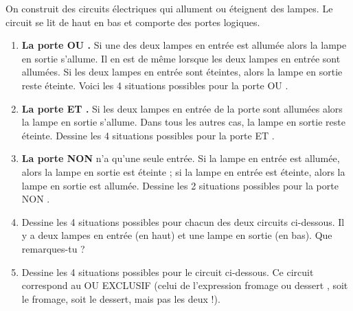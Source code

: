 \documentclass[class=report,crop=false, 12pt]{standalone}
\begin{document}
\begin{activite}
On construit des circuits électriques qui allument ou éteignent des lampes. Le circuit se lit de haut en bas et comporte des portes logiques.


\begin{enumerate}
  \item \textbf{La porte \og OU \fg{}.} Si une des deux lampes en entrée est allumée alors la lampe en sortie s'allume. Il en est de même lorsque les deux lampes en entrée sont allumées. Si les deux lampes en entrée sont éteintes, alors la lampe en sortie reste éteinte.
Voici les 4 situations possibles pour la porte \og OU \fg{}.




  \item \textbf{La porte \og ET \fg{}.} Si les deux lampes en entrée de la porte sont allumées alors la lampe en sortie s'allume. Dans tous les autres cas, la lampe en sortie reste éteinte.
Dessine les 4 situations possibles pour la porte \og ET \fg{}.



 
  \item \textbf{La porte \og NON \fg{}} n'a qu'une seule entrée. Si la lampe en entrée est allumée, alors la lampe en sortie est éteinte ; si la lampe en entrée est éteinte, alors la lampe en sortie est allumée. 
Dessine les 2 situations possibles pour la porte \og NON \fg{}.

  
  \item Dessine les 4 situations possibles pour chacun des deux circuits ci-dessous. Il y a deux lampes en entrée (en haut) et une lampe en sortie (en bas). Que remarques-tu ?
  
  

\bigskip



  
  \item Dessine les 4 situations possibles pour le circuit ci-dessous. Ce circuit correspond au \og OU EXCLUSIF \fg{} (celui de l'expression \og fromage ou dessert \fg{}, soit le fromage, soit le dessert, mais pas les deux !).
  

\end{enumerate}
\end{activite}
\end{document}
